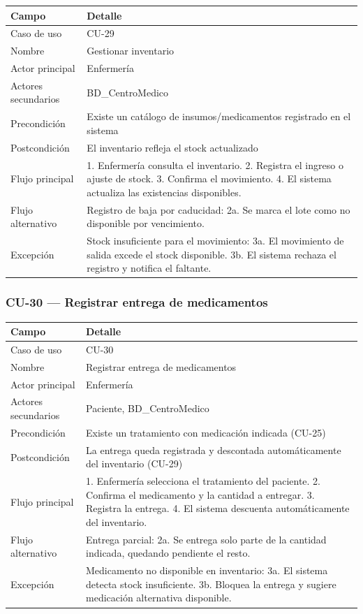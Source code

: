 \documentclass[11pt,a4paper]{article}
\begin{document}
	\begin{longtable}{p{} p{} }
		\toprule
		\textbf{Campo} & \textbf{Detalle} \\
		\midrule
		\endhead
		Caso de uso & CU-29 \\
		Nombre & Gestionar inventario \\
		Actor principal & Enfermería \\
		Actores secundarios & BD\_CentroMedico \\
		Precondición & Existe un catálogo de insumos/medicamentos registrado en el sistema \\
		Postcondición & El inventario refleja el stock actualizado \\
		Flujo principal & 1. Enfermería consulta el inventario. 2. Registra el ingreso o ajuste de stock. 3. Confirma el movimiento. 4. El sistema actualiza las existencias disponibles. \\
		Flujo alternativo & Registro de baja por caducidad: 2a. Se marca el lote como no disponible por vencimiento. \\
		Excepción & Stock insuficiente para el movimiento: 3a. El movimiento de salida excede el stock disponible. 3b. El sistema rechaza el registro y notifica el faltante. \\
		\bottomrule
	\end{longtable}
	
	\subsubsection{CU-30 --- Registrar entrega de medicamentos}
	
	\begin{longtable}{p{} p{} }
		\toprule
		\textbf{Campo} & \textbf{Detalle} \\
		\midrule
		\endhead
		Caso de uso & CU-30 \\
		Nombre & Registrar entrega de medicamentos \\
		Actor principal & Enfermería \\
		Actores secundarios & Paciente, BD\_CentroMedico \\
		Precondición & Existe un tratamiento con medicación indicada (CU-25) \\
		Postcondición & La entrega queda registrada y descontada automáticamente del inventario (CU-29) \\
		Flujo principal & 1. Enfermería selecciona el tratamiento del paciente. 2. Confirma el medicamento y la cantidad a entregar. 3. Registra la entrega. 4. El sistema descuenta automáticamente del inventario. \\
		Flujo alternativo & Entrega parcial: 2a. Se entrega solo parte de la cantidad indicada, quedando pendiente el resto. \\
		Excepción & Medicamento no disponible en inventario: 3a. El sistema detecta stock insuficiente. 3b. Bloquea la entrega y sugiere medicación alternativa disponible. \\
		\bottomrule
	\end{longtable}
	
\end{document}
